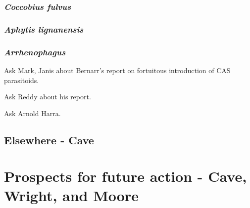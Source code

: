 \documentclass[12pt,letterpaper,english,bibliography=totocnumbered, abstract=on]{scrartcl}
\begin{document}
\subsubsection{\textit{Coccobius fulvus}}  

\subsubsection{\textit{Aphytis lignanensis}}

\subsubsection{\textit{Arrhenophagus}}  

Ask Mark, Janis about Bernarr's report on fortuitous introduction of CAS parasitoids.

Ask Reddy about his report.

Ask Arnold Harra.


\subsection{Elsewhere - Cave}

\section{Prospects for future action - Cave, Wright, and Moore}

\newpage
\printbibliography[heading=bibintoc]
\end{document}
